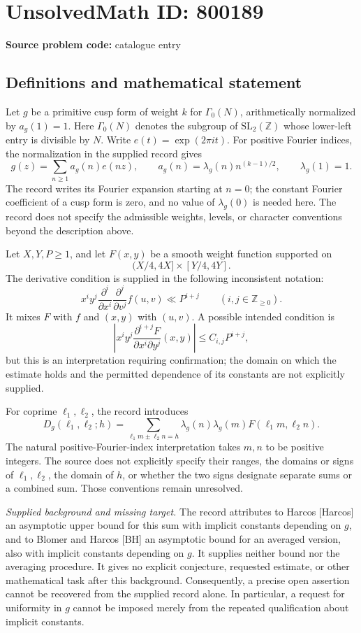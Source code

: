 \documentclass[11pt]{article}
\newcommand{\Z}{\mathbb{Z}}
\begin{document}
\section*{UnsolvedMath ID: 800189}
\textbf{Source problem code:} catalogue entry
\subsection{Definitions and mathematical statement}
Let \(g\) be a primitive cusp form of weight \(k\) for \(\Gamma_0(N)\), arithmetically normalized by \(a_g(1)=1\). Here \(\Gamma_0(N)\) denotes the subgroup of \(\mathrm{SL}_2(\Z)\) whose lower-left entry is divisible by \(N\). Write \(e(t)=\exp(2\pi i t)\). For positive Fourier indices, the normalization in the supplied record gives
\[
g(z)=\sum_{n\geq 1}a_g(n)e(nz),\qquad a_g(n)=\lambda_g(n)n^{(k-1)/2},\qquad \lambda_g(1)=1.
\]
The record writes its Fourier expansion starting at \(n=0\); the constant Fourier coefficient of a cusp form is zero, and no value of \(\lambda_g(0)\) is needed here. The record does not specify the admissible weights, levels, or character conventions beyond the description above.

Let \(X,Y,P\geq1\), and let \(F(x,y)\) be a smooth weight function supported on
\[
(X/4,4X]\times[Y/4,4Y].
\]
The derivative condition is supplied in the following inconsistent notation:
\[
x^iy^j\frac{\partial^i}{\partial{x^i}}\frac{\partial^j}{\partial v^j}f(u,v)\ll P^{i+j}
\qquad(i,j\in\Z_{\geq0}).
\]
It mixes \(F\) with \(f\) and \((x,y)\) with \((u,v)\). A possible intended condition is
\[
\left|x^iy^j\frac{\partial^{i+j}F}{\partial x^i\partial y^j}(x,y)\right|
\leq C_{i,j}P^{i+j},
\]
but this is an interpretation requiring confirmation; the domain on which the estimate holds and the permitted dependence of its constants are not explicitly supplied.

For coprime \(\ell_1,\ell_2\), the record introduces
\[
D_g(\ell_1,\ell_2;h)
=\sum_{\ell_1m\pm\ell_2n=h}
\lambda_g(n)\lambda_g(m)F(\ell_1m,\ell_2n).
\]
The natural positive-Fourier-index interpretation takes \(m,n\) to be positive integers. The source does not explicitly specify their ranges, the domains or signs of \(\ell_1,\ell_2\), the domain of \(h\), or whether the two signs designate separate sums or a combined sum. Those conventions remain unresolved.

\textit{Supplied background and missing target.} The record attributes to Harcos [Harcos] an asymptotic upper bound for this sum with implicit constants depending on \(g\), and to Blomer and Harcos [BH] an asymptotic bound for an averaged version, also with implicit constants depending on \(g\). It supplies neither bound nor the averaging procedure. It gives no explicit conjecture, requested estimate, or other mathematical task after this background. Consequently, a precise open assertion cannot be recovered from the supplied record alone. In particular, a request for uniformity in \(g\) cannot be imposed merely from the repeated qualification about implicit constants.
\end{document}
